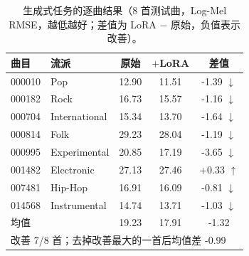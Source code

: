 \begin{table}[H]
\centering\small
\caption{生成式任务的逐曲结果（8 首测试曲，Log-Mel RMSE，越低越好；差值为 LoRA $-$ 原始，负值表示改善）。}
\label{tab:gentrack}
\begin{tabular}{llccc}
\toprule
曲目 & 流派 & 原始 & $+$LoRA & 差值\\
\midrule
000010 & Pop & 12.90 & 11.51 & -1.39 $\downarrow$\\
000182 & Rock & 16.73 & 15.57 & -1.16 $\downarrow$\\
000704 & International & 15.34 & 13.70 & -1.64 $\downarrow$\\
000814 & Folk & 29.23 & 28.04 & -1.19 $\downarrow$\\
000995 & Experimental & 20.85 & 17.19 & -3.65 $\downarrow$\\
001482 & Electronic & 27.13 & 27.46 & +0.33 $\uparrow$\\
007481 & Hip-Hop & 16.91 & 16.09 & -0.81 $\downarrow$\\
014568 & Instrumental & 14.74 & 13.71 & -1.03 $\downarrow$\\
\midrule
均值 & & 19.23 & 17.91 & -1.32\\
\multicolumn{5}{l}{改善 7/8 首；去掉改善最大的一首后均值差 -0.99}\\
\bottomrule
\end{tabular}
\end{table}
